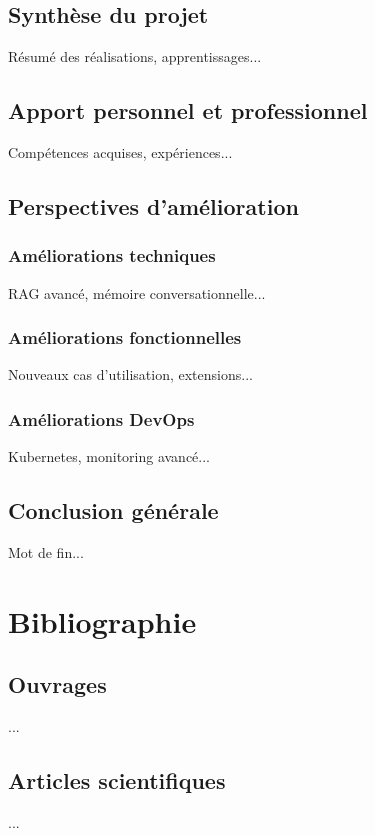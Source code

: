 \documentclass[12pt,a4paper]{report}
\begin{document}
\section{Synthèse du projet}
Résumé des réalisations, apprentissages...

\section{Apport personnel et professionnel}
Compétences acquises, expériences...

\section{Perspectives d'amélioration}
\subsection{Améliorations techniques}
RAG avancé, mémoire conversationnelle...

\subsection{Améliorations fonctionnelles}
Nouveaux cas d'utilisation, extensions...

\subsection{Améliorations DevOps}
Kubernetes, monitoring avancé...

\section{Conclusion générale}
Mot de fin...

\chapter{Bibliographie}
\label{chap:bibliographie}

\section{Ouvrages}
...

\section{Articles scientifiques}
...
\end{document}

